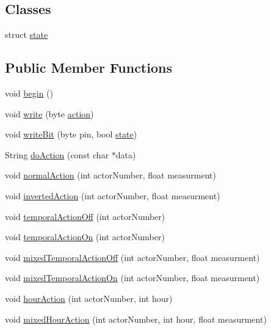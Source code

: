 \subsection*{Classes}
\begin{DoxyCompactItemize}
\item 
struct \hyperlink{struct_jetpack_1_1state}{state}
\end{DoxyCompactItemize}
\subsection*{Public Member Functions}
\begin{DoxyCompactItemize}
\item 
void \hyperlink{class_jetpack_a5a53e1ebf7aaf3bf3e0d37ea64ca09a7}{begin} ()
\item 
void \hyperlink{class_jetpack_a338f1af8cbc6504ac69b47c7328569b5}{write} (byte \hyperlink{class_jetpack_aca3142925a7b0834b34ae91d26af7765}{action})
\item 
void \hyperlink{class_jetpack_a79ae7bc3c1828a0551a7c005c4f8bd00}{write\+Bit} (byte pin, bool \hyperlink{struct_jetpack_1_1state}{state})
\item 
String \hyperlink{class_jetpack_af9acedb606340c26c2636c282b54dff1}{do\+Action} (const char $\ast$data)
\item 
void \hyperlink{class_jetpack_a65ce9533c39fa71e4945b970bf14b980}{normal\+Action} (int actor\+Number, float measurment)
\item 
void \hyperlink{class_jetpack_adacfc35fab4a621357caf98ce1c9cb54}{inverted\+Action} (int actor\+Number, float measurment)
\item 
void \hyperlink{class_jetpack_a2991b302cd99bf89325f9b66b104d575}{temporal\+Action\+Off} (int actor\+Number)
\item 
void \hyperlink{class_jetpack_ad011d904f639accb5f94ef806846ef59}{temporal\+Action\+On} (int actor\+Number)
\item 
void \hyperlink{class_jetpack_af2f567ef6311a8fc2f7bb948837667b7}{mixed\+Temporal\+Action\+Off} (int actor\+Number, float measurment)
\item 
void \hyperlink{class_jetpack_af44bc8a08818e4433dfb1c7104601f12}{mixed\+Temporal\+Action\+On} (int actor\+Number, float measurment)
\item 
void \hyperlink{class_jetpack_acd6889af2fe5b057c6bd51b6dac827ef}{hour\+Action} (int actor\+Number, int hour)
\item 
void \hyperlink{class_jetpack_ac1a49ab4867718cdb415ad74c2066b9d}{mixed\+Hour\+Action} (int actor\+Number, int hour, float measurment)

\end{DoxyCompactItemize}

